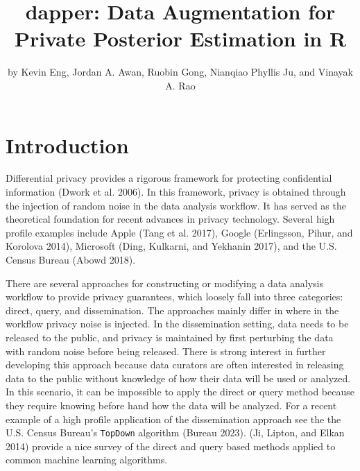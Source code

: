 \title{dapper: Data Augmentation for Private Posterior Estimation in R}


\author{by Kevin Eng, Jordan A. Awan, Ruobin Gong, Nianqiao Phyllis Ju, and Vinayak A. Rao}

\maketitle


\hypertarget{introduction}{%
\section{Introduction}\label{introduction}}

Differential privacy provides a rigorous framework for protecting
confidential information (Dwork et al. 2006). In this framework, privacy is obtained
through the injection of random noise in the data analysis workflow.
It has served as the theoretical foundation for recent advances in privacy technology. Several high profile
examples include Apple (Tang et al. 2017), Google (Erlingsson, Pihur, and Korolova 2014), Microsoft (Ding, Kulkarni, and Yekhanin 2017), and the
U.S. Census Bureau (Abowd 2018).

There are several approaches for constructing or modifying a data analysis workflow
to provide privacy guarantees, which loosely fall into three categories: direct, query, and dissemination.
The approaches mainly differ in where in the workflow privacy noise is injected.
In the dissemination setting, data needs to be released to the public, and privacy is maintained by first
perturbing the data with random noise before being released. There is strong interest
in further developing this approach because data curators are often interested
in releasing data to the public without knowledge of how their data will
be used or analyzed. In this scenario, it can be impossible to apply the direct or
query method because they require knowing before hand how the data will be analyzed.
For a recent example of a high profile application of the dissemination approach
see the the U.S. Census Bureau's \texttt{TopDown} algorithm (Bureau 2023). (Ji, Lipton, and Elkan 2014)
provide a nice survey of the direct and query based methods applied to
common machine learning algorithms.

